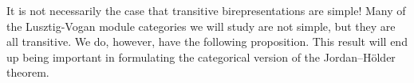 \noindent It is not necessarily the case that transitive birepresentations are simple! Many of the Lusztig-Vogan module categories we will study are not simple, but they are all transitive. We do, however, have the following proposition. This result will end up being important in formulating the categorical version of the Jordan--H\"{o}lder theorem.\\ %




